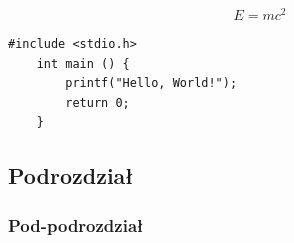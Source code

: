 \lipsum[2] \cite{min2017deep} %

\begin{equ}[!ht]                        %
  \begin{equation}                      %
    E=mc^2                              %
  \end{equation}                        %
\end{equ}                               %

\lipsum[2] %

\begin{lstlisting}[caption=Podpis listingu,label=code1]
    #include <stdio.h>
    int main () {
        printf("Hello, World!");
        return 0;
    }
\end{lstlisting}
\subsection{Podrozdział}

\lipsum[1-15]    %

\subsubsection{Pod-podrozdział}

\lipsum[1-5]    %
